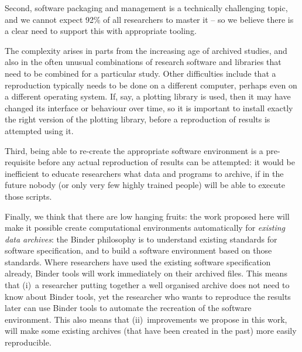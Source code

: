 Second, software packaging and management is a technically challenging topic,
and we cannot expect 92\% of all researchers to master it -- so we believe there
is a clear need to support this with appropriate tooling.

The complexity arises in parts from the increasing age of archived studies, and
also in the often unusual combinations of research software and libraries that
need to be combined for a particular study. Other difficulties include that a
reproduction typically needs to be done on a different computer, perhaps even on
a different operating system. If, say, a plotting library is used, then it may
have changed its interface or behaviour over time, so it is important to install
exactly the right version of the plotting library, before a reproduction of
results is attempted using it.

Third, being able to re-create the appropriate software environment is a
pre-requisite before any actual reproduction of results can be attempted: it
would be inefficient to educate researchers what data and programs to archive,
if in the future nobody (or only very few highly trained people) will be able to
execute those scripts.

Finally, we think that there are low hanging fruits: the work proposed here will
make it possible create computational environments automatically for
\emph{existing data archives}: the Binder philosophy is to understand existing standards for software
specification, and to build a software environment based on those standards.
Where researchers have used the existing software specification already, Binder tools
will work immediately on their archived files. This means that (i)~a researcher
putting together a well organised archive does not need to know about Binder tools,
yet the researcher who wants to reproduce the results later can use Binder tools to
automate the recreation of the software environment. This also means that
(ii)~improvements we propose in this work, will make some existing archives (that
have been created in the past) more easily reproducible.


